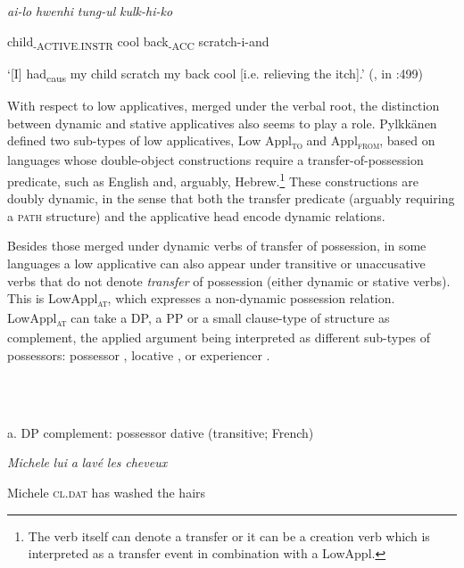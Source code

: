 \documentclass[output=paper,modfonts,nonflat]{langsci/langscibook}
\begin{document}
\ea%
    \label{ex:key:5}
    \gll\\
        \\
    \glt
    \z

           \textit{ai-lo} \textit{hwenhi} \textit{tung-ul} \textit{kulk-hi-ko}

  child\textsubscript{{}-ACTIVE.INSTR} cool back\textsubscript{{}-ACC} scratch-i-and

  ‘[I] had\textsubscript{caus} my child scratch my back cool [i.e. relieving the   itch].’         (\citealt{Park1994}, in \citealt{Kim2011}:499)

With respect to low applicatives, merged under the verbal root, the distinction between dynamic and stative applicatives also seems to play a role. Pylkkänen defined two sub-types of low applicatives, Low Appl\textsc{\textsubscript{to}}\textsubscript{} and Appl\textsc{\textsubscript{from}}, based on languages whose double-object constructions require a transfer-of-possession predicate, such as English and, arguably, Hebrew.\footnote{The verb itself can denote a transfer or it can be a creation verb which is interpreted as a transfer event in combination with a LowAppl.}  These constructions are doubly dynamic, in the sense that both the transfer predicate (arguably requiring a \textsc{path} structure) and the applicative head encode dynamic relations.  

Besides those merged under dynamic verbs of transfer of possession, in some languages a low applicative can also appear under transitive or unaccusative verbs that do not denote \textit{transfer} of possession (either dynamic or stative verbs). This is  LowAppl\textsc{\textsubscript{at}}, which expresses a non-dynamic possession relation. LowAppl\textsc{\textsubscript{at}} can take  a DP, a PP or a small clause-type of structure as complement, the applied argument being interpreted as different sub-types of possessors: possessor , locative , or experiencer .

\ea%
    \label{ex:key:6}
    \gll\\
        \\
    \glt
    \z

             a.  DP complement: possessor dative (transitive; French)

  \textit{Michele}    \textit{lui}       \textit{a} \textit{lavé}     \textit{les} \textit{cheveux}   

  Michele   \textsc{cl.dat} has washed   the hairs
\end{document}
